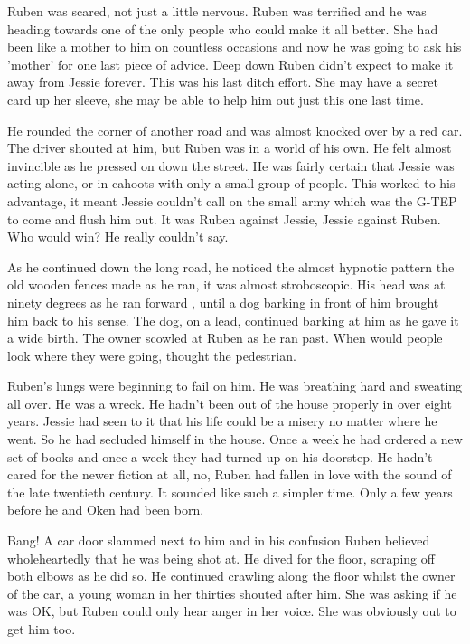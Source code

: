 Ruben was scared, not just a little nervous.  Ruben was terrified and he was heading towards one of the only people who could make it all better.  She had been like a mother to him on countless occasions and now he was going to ask his 'mother' for one last piece of advice.  Deep down Ruben didn't expect to make it away from Jessie forever.  This was his last ditch effort.  She may have a secret card up her sleeve, she may be able to help him out just this one last time.

He rounded the corner of another road and was almost knocked over by a red car.  The driver shouted at him, but Ruben was in a world of his own.  He felt almost invincible as he pressed on down the street.  He was fairly certain that Jessie was acting alone, or in cahoots with only a small group of people.  This worked to his advantage, it meant Jessie couldn't call on the small army which was the G-TEP to come and flush him out.  It was Ruben against Jessie, Jessie against Ruben.  Who would win?  He really couldn't say.

As he continued down the long road, he noticed the almost hypnotic pattern the old wooden fences made as he ran, it was almost stroboscopic.  His head was at ninety degrees as he ran forward , until a dog barking in front of him brought him back to his sense.  The dog, on a lead, continued barking at him as he gave it a wide birth.  The owner scowled at Ruben as he ran past.  When would people look where they were going, thought the pedestrian.

Ruben's lungs were beginning to fail on him.  He was breathing hard and sweating all over.  He was a wreck.  He hadn't been out of the house properly in over eight years.  Jessie had seen to it that his life could be a misery no matter where he went.  So he had secluded himself in the house.  Once a week he had ordered a new set of books and once a week they had turned up on his doorstep.  He hadn't cared for the newer fiction at all, no, Ruben had fallen in love with the sound of the late twentieth century.  It sounded like such a simpler time.  Only a few years before he and Oken had been born.

Bang!  A car door slammed next to him and in his confusion Ruben believed wholeheartedly that he was being shot at.  He dived for the floor, scraping off both elbows as he did so.  He continued crawling along the floor whilst the owner of the car, a young woman in her thirties shouted after him.  She was asking if he was OK, but Ruben could only hear anger in her voice.  She was obviously out to get him too.

